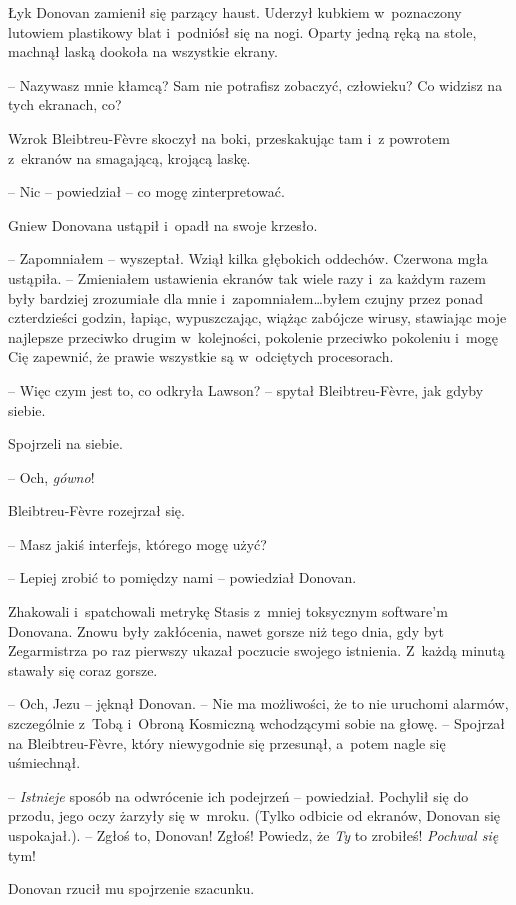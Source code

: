 \documentclass[oneside,polish,11pt,sfheadings]{mwbk}
\begin{document}
Łyk Donovan zamienił się parzący haust. Uderzył kubkiem w~poznaczony
lutowiem plastikowy blat i~podniósł się na nogi. Oparty jedną ręką na
stole, machnął laską dookoła na wszystkie ekrany.

-- Nazywasz mnie kłamcą? Sam nie potrafisz zobaczyć, człowieku? Co
widzisz na tych ekranach, co?

Wzrok Bleibtreu-Fèvre skoczył na boki, przeskakując tam i~z powrotem z~ekranów na smagającą, krojącą laskę.

-- Nic -- powiedział -- co mogę zinterpretować.

Gniew Donovana ustąpił i~opadł na swoje krzesło.

-- Zapomniałem -- wyszeptał. Wziął kilka głębokich oddechów. Czerwona mgła
ustąpiła. -- Zmieniałem ustawienia ekranów tak wiele razy i~za każdym
razem były bardziej zrozumiałe dla mnie i~zapomniałem\ldots byłem czujny
przez ponad czterdzieści godzin, łapiąc, wypuszczając, wiążąc zabójcze
wirusy, stawiając moje najlepsze przeciwko drugim w~kolejności,
pokolenie przeciwko pokoleniu i~mogę Cię zapewnić, że prawie wszystkie
są w~odciętych procesorach.

-- Więc czym jest to, co odkryła Lawson? -- spytał Bleibtreu-Fèvre, jak
gdyby siebie.

Spojrzeli na siebie.

-- Och, \emph{gówno}!

Bleibtreu-Fèvre rozejrzał się. 

-- Masz jakiś interfejs, którego mogę
użyć?

-- Lepiej zrobić to pomiędzy nami -- powiedział Donovan.

Zhakowali i~spatchowali metrykę Stasis z~mniej toksycznym software'm
Donovana. Znowu były zakłócenia, nawet gorsze niż tego dnia, gdy byt
Zegarmistrza po raz pierwszy ukazał poczucie swojego istnienia. Z~każdą
minutą stawały się coraz gorsze.

-- Och, Jezu -- jęknął Donovan. -- Nie ma możliwości, że to nie uruchomi
alarmów, szczególnie z~Tobą i~Obroną Kosmiczną wchodzącymi sobie na
głowę. -- Spojrzał na Bleibtreu-Fèvre, który niewygodnie się przesunął, a~potem nagle się uśmiechnął.

-- \emph{Istnieje }sposób na odwrócenie ich podejrzeń -- powiedział.
Pochylił się do przodu, jego oczy żarzyły się w~mroku. (Tylko odbicie od
ekranów, Donovan się uspokajał.). -- Zgłoś to, Donovan! Zgłoś! Powiedz,
że \emph{Ty} to zrobiłeś! \emph{Pochwal się} tym!

Donovan rzucił mu spojrzenie szacunku. 
\end{document}
